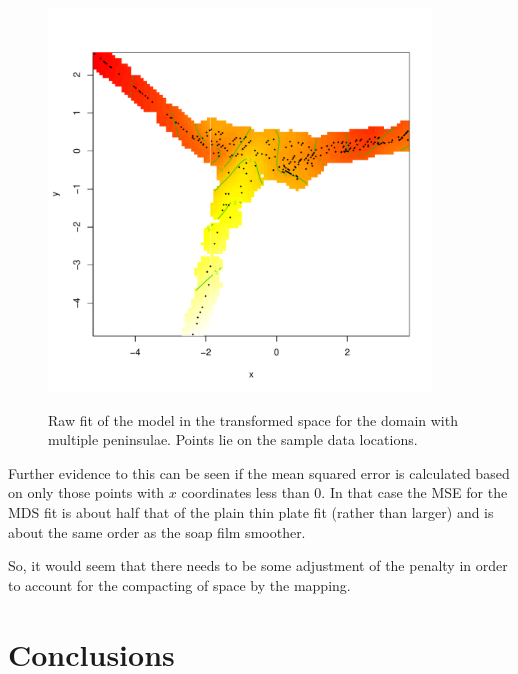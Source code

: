 \documentclass[a4paper,10pt]{article}
\begin{document}
\begin{figure}
\centering
\includegraphics[width=4in]{figs/wt2-visgam.pdf}\\
\caption{Raw fit of the model in the transformed space for the domain with multiple peninsulae. Points lie on the sample data locations.}
\label{wt2-visgam}
\end{figure}

Further evidence to this can be seen if the mean squared error is calculated based on only those points with $x$ coordinates less than 0. In that case the MSE for the MDS fit is about half that of the plain thin plate fit (rather than larger) and is about the same order as the soap film smoother.

So, it would seem that there needs to be some adjustment of the penalty in order to account for the compacting of space by the mapping.

\section{Conclusions}
\end{document}
